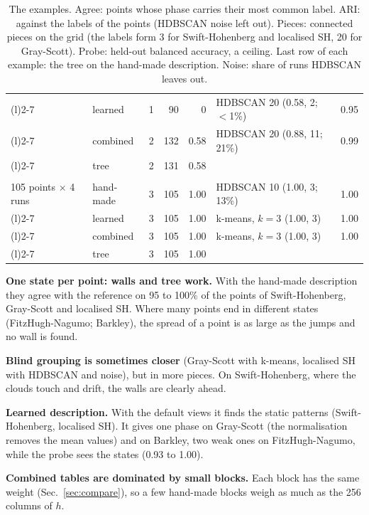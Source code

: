 \documentclass[11pt,a4paper]{article}
\begin{document}
\begin{table}[H]
\begin{tabular}{@{}>{\raggedright}p{2.5cm}lrrr>{\raggedright}p{5.0cm}r@{}}
\arrayrulecolor{black!30}\cmidrule[0.3pt](l){2-7}\arrayrulecolor{black}
 & learned & 1 & 90 & 0 & HDBSCAN 20 (0.58, 2; $<$1\%) & 0.95 \\
\arrayrulecolor{black!30}\cmidrule[0.3pt](l){2-7}\arrayrulecolor{black}
 & combined & 2 & 132 & 0.58 & HDBSCAN 20 (0.88, 11; 21\%) & 0.99 \\
\arrayrulecolor{black!30}\cmidrule[0.3pt](l){2-7}\arrayrulecolor{black}
 & tree & 2 & 131 & 0.58 &  &  \\
\midrule
\multirow{4}{=}{\textbf{localised SH}\\ 105 points $\times$ 4 runs} & hand-made & 3 & 105 & 1.00 & HDBSCAN 10 (1.00, 3; 13\%) & 1.00 \\
\arrayrulecolor{black!30}\cmidrule[0.3pt](l){2-7}\arrayrulecolor{black}
 & learned & 3 & 105 & 1.00 & k-means, $k=3$ (1.00, 3) & 1.00 \\
\arrayrulecolor{black!30}\cmidrule[0.3pt](l){2-7}\arrayrulecolor{black}
 & combined & 3 & 105 & 1.00 & k-means, $k=3$ (1.00, 3) & 1.00 \\
\arrayrulecolor{black!30}\cmidrule[0.3pt](l){2-7}\arrayrulecolor{black}
 & tree & 3 & 105 & 1.00 &  &  \\
\bottomrule
\end{tabular}
\caption{The examples. Agree: points whose phase carries their most common label. ARI: against
the labels of the points (HDBSCAN noise left out). Pieces: connected pieces on the grid (the labels
form 3 for Swift-Hohenberg and localised SH, 20 for Gray-Scott). Probe: held-out balanced accuracy, a
ceiling. Last row of each example: the tree on the hand-made description. Noise: share of runs
HDBSCAN leaves out.}
\label{tab:examples}
\end{table}

\begin{tech}
\textbf{One state per point: walls and tree work.} With the hand-made description they agree with
the reference on 95 to 100\% of the points of Swift-Hohenberg, Gray-Scott and localised SH. Where
many points end in different states (FitzHugh-Nagumo; Barkley), the spread of a point is as large as
the jumps and no wall is found.

\textbf{Blind grouping is sometimes closer} (Gray-Scott with k-means, localised SH with HDBSCAN and
noise), but in more pieces. On Swift-Hohenberg, where the clouds touch and drift, the walls are
clearly ahead.

\textbf{Learned description.} With the default views it finds the static patterns (Swift-Hohenberg,
localised SH). It gives one phase on Gray-Scott (the normalisation removes the mean values) and on
Barkley, two weak ones on FitzHugh-Nagumo, while the probe sees the states (0.93 to 1.00).

\textbf{Combined tables are dominated by small blocks.} Each block has the same weight
(Sec.~\ref{sec:compare}), so a few hand-made blocks weigh as much as the 256 columns of $h$.
\end{tech}
\end{document}
